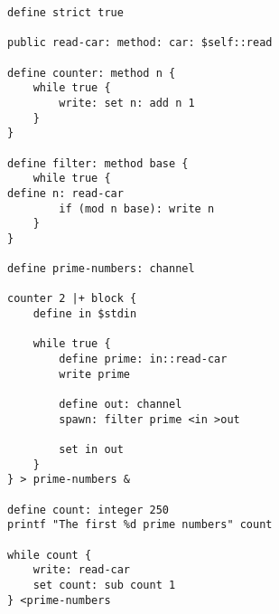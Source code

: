\documentclass[12pt]{book}
\begin{document}
\begin{lstlisting}
define strict true

public read-car: method: car: $self::read

define counter: method n {
    while true {
        write: set n: add n 1
    }
}

define filter: method base {
    while true {
define n: read-car
        if (mod n base): write n
    }
}

define prime-numbers: channel

counter 2 |+ block {
    define in $stdin

    while true {
        define prime: in::read-car
        write prime

        define out: channel
        spawn: filter prime <in >out

        set in out
    }
} > prime-numbers &

define count: integer 250
printf "The first %d prime numbers" count

while count {
    write: read-car
    set count: sub count 1
} <prime-numbers
\end{lstlisting}




\end{document}
